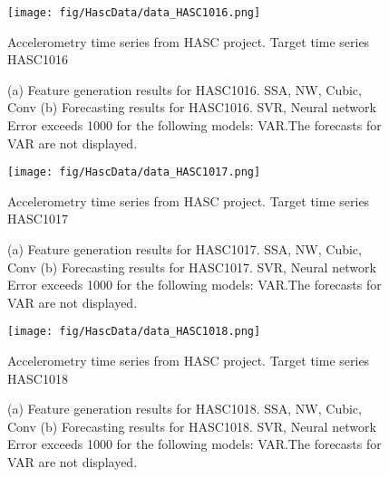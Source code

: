 \documentclass[12pt]{article}
\begin{document}
\begin{figure}
\centering
\texttt{[image: fig/HascData/data\_HASC1016.png]}
\caption{Accelerometry time series from HASC project. Target time series	HASC1016	}
\end{figure}


\begin{figure}
\centering
{}
\caption{(a)	Feature generation results for	HASC1016.	SSA, NW, Cubic, Conv	(b)	Forecasting results for	HASC1016.	SVR, Neural network	Error exceeds 1000 for the following models: VAR.The forecasts for VAR are not displayed.	}
\end{figure}


\begin{figure}
\centering
\texttt{[image: fig/HascData/data\_HASC1017.png]}
\caption{Accelerometry time series from HASC project. Target time series	HASC1017	}
\end{figure}


\begin{figure}
\centering
{}
\caption{(a)	Feature generation results for	HASC1017.	SSA, NW, Cubic, Conv	(b)	Forecasting results for	HASC1017.	SVR, Neural network	Error exceeds 1000 for the following models: VAR.The forecasts for VAR are not displayed.	}
\end{figure}


\begin{figure}
\centering
\texttt{[image: fig/HascData/data\_HASC1018.png]}
\caption{Accelerometry time series from HASC project. Target time series	HASC1018	}
\end{figure}


\begin{figure}
\centering
{}
\caption{(a)	Feature generation results for	HASC1018.	SSA, NW, Cubic, Conv	(b)	Forecasting results for	HASC1018.	SVR, Neural network	Error exceeds 1000 for the following models: VAR.The forecasts for VAR are not displayed.	}
\end{figure}
\end{document}
